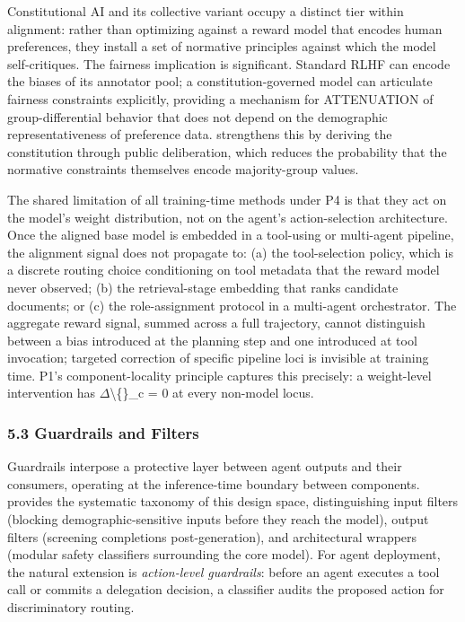 \documentclass[10pt]{article}
\begin{document}
Constitutional AI \cite{bai2022constitutional} and its collective variant \cite{huang2024collective} occupy a distinct tier within alignment: rather than optimizing against a reward model that encodes human preferences, they install a set of normative principles against which the model self-critiques. The fairness implication is significant. Standard RLHF can encode the biases of its annotator pool; a constitution-governed model can articulate fairness constraints explicitly, providing a mechanism for ATTENUATION of group-differential behavior that does not depend on the demographic representativeness of preference data. \cite{huang2024collective} strengthens this by deriving the constitution through public deliberation, which reduces the probability that the normative constraints themselves encode majority-group values.

The shared limitation of all training-time methods under P4 is that they act on the model's weight distribution, not on the agent's action-selection architecture. Once the aligned base model is embedded in a tool-using or multi-agent pipeline, the alignment signal does not propagate to: (a) the tool-selection policy, which is a discrete routing choice conditioning on tool metadata that the reward model never observed; (b) the retrieval-stage embedding that ranks candidate documents; or (c) the role-assignment protocol in a multi-agent orchestrator. The aggregate reward signal, summed across a full trajectory, cannot distinguish between a bias introduced at the planning step and one introduced at tool invocation; targeted correction of specific pipeline loci is invisible at training time. P1's component-locality principle captures this precisely: a weight-level intervention has $\Delta$\textbackslash\{\}\_c = 0 at every non-model locus.

\subsubsection*{5.3 Guardrails and Filters}

Guardrails interpose a protective layer between agent outputs and their consumers, operating at the inference-time boundary between components. \cite{dong2024building} provides the systematic taxonomy of this design space, distinguishing input filters (blocking demographic-sensitive inputs before they reach the model), output filters (screening completions post-generation), and architectural wrappers (modular safety classifiers surrounding the core model). For agent deployment, the natural extension is \emph{action-level guardrails}: before an agent executes a tool call or commits a delegation decision, a classifier audits the proposed action for discriminatory routing.
\end{document}
